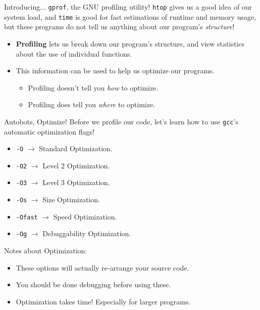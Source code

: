 \documentclass[11pt]{beamer}
\begin{document}
\begin{frame}{Introducing... \texttt{gprof}, the GNU profiling utility!}
\texttt{htop} gives us a good idea of our system load, and \texttt{time} is good for fast estimations of runtime and memory usage, but these programs do not tell us anything about our program's \emph{structure}!
\begin{itemize}
\item \textbf{Profiling} lets us break down our program's structure, and view statistics about the use of individual functions.  
\item This information can be used to help us optimize our programs.
\begin{itemize}
\item Profiling doesn't tell you \emph{how} to optimize.
\item Profiling does tell you \emph{where} to optimize.
\end{itemize}
\end{itemize}
\end{frame}

\begin{frame}{Autobots, Optimize!}
Before we profile our code, let's learn how to use \texttt{gcc}'s automatic optimization flags! 
\begin{itemize}
\item \texttt{-O} $\rightarrow$ Standard Optimization.
\item \texttt{-O2} $\rightarrow$ Level 2 Optimization.
\item \texttt{-O3} $\rightarrow$ Level 3 Optimization.
\item \texttt{-Os} $\rightarrow$ Size Optimization.
\item \texttt{-Ofast} $\rightarrow$ Speed Optimization. 
\item \texttt{-Og} $\rightarrow$ Debuggability Optimization.
\end{itemize}
Notes about Optimization:
\begin{itemize}
\item These options will actually re-arrange your source code.
\item You should be done debugging before using these.
\item Optimization takes time!  Especially for larger programs.
\end{itemize}
\end{frame}
\end{document}
